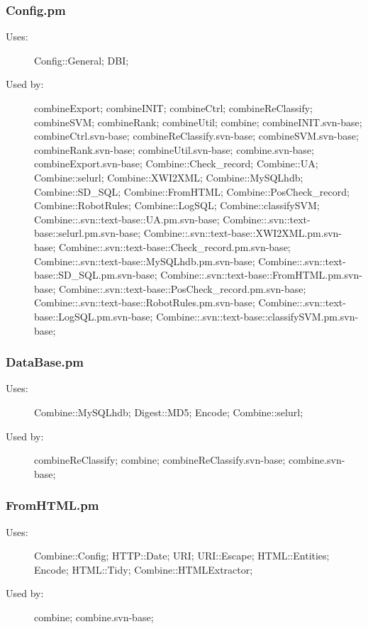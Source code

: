 \subsubsection{Config.pm}
\begin{description}
\item[Uses:] Config::General; DBI; 

\item[Used by:] combineExport; combineINIT; combineCtrl; combineReClassify; combineSVM; combineRank; combineUtil; combine; combineINIT.svn-base; combineCtrl.svn-base; combineReClassify.svn-base; combineSVM.svn-base; combineRank.svn-base; combineUtil.svn-base; combine.svn-base; combineExport.svn-base; Combine::Check\_record; Combine::UA; Combine::selurl; Combine::XWI2XML; Combine::MySQLhdb; Combine::SD\_SQL; Combine::FromHTML; Combine::PosCheck\_record; Combine::RobotRules; Combine::LogSQL; Combine::classifySVM; Combine::.svn::text-base::UA.pm.svn-base; Combine::.svn::text-base::selurl.pm.svn-base; Combine::.svn::text-base::XWI2XML.pm.svn-base; Combine::.svn::text-base::Check\_record.pm.svn-base; Combine::.svn::text-base::MySQLhdb.pm.svn-base; Combine::.svn::text-base::SD\_SQL.pm.svn-base; Combine::.svn::text-base::FromHTML.pm.svn-base; Combine::.svn::text-base::PosCheck\_record.pm.svn-base; Combine::.svn::text-base::RobotRules.pm.svn-base; Combine::.svn::text-base::LogSQL.pm.svn-base; Combine::.svn::text-base::classifySVM.pm.svn-base; 

\end{description}
\subsubsection{DataBase.pm}
\begin{description}
\item[Uses:] Combine::MySQLhdb; Digest::MD5; Encode; Combine::selurl; 

\item[Used by:] combineReClassify; combine; combineReClassify.svn-base; combine.svn-base; 

\end{description}
\subsubsection{FromHTML.pm}
\begin{description}
\item[Uses:] Combine::Config; HTTP::Date; URI; URI::Escape; HTML::Entities; Encode; HTML::Tidy; Combine::HTMLExtractor; 

\item[Used by:] combine; combine.svn-base; 

\end{description}
